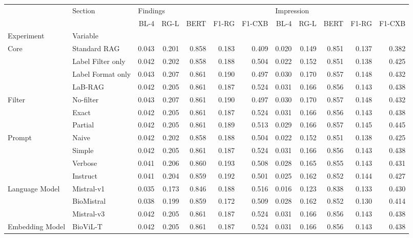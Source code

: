 \begin{tabular}{llrrrrrrrrrr}
\toprule
 & Section & \multicolumn{5}{l}{Findings} & \multicolumn{5}{l}{Impression} \\
 &  & BL-4 & RG-L & BERT & F1-RG & F1-CXB & BL-4 & RG-L & BERT & F1-RG & F1-CXB \\
Experiment & Variable &  &  &  &  &  &  &  &  &  &  \\
\midrule
\multirow[c]{4}{*}{Core} & Standard RAG & 0.043 & 0.201 & 0.858 & 0.183 & 0.409 & 0.020 & 0.149 & 0.851 & 0.137 & 0.382 \\
 & Label Filter only & 0.042 & 0.202 & 0.858 & 0.188 & 0.504 & 0.022 & 0.152 & 0.851 & 0.138 & 0.425 \\
 & Label Format only & 0.043 & 0.207 & 0.861 & 0.190 & 0.497 & 0.030 & 0.170 & 0.857 & 0.148 & 0.432 \\
 & LaB-RAG & 0.042 & 0.205 & 0.861 & 0.187 & 0.524 & 0.031 & 0.166 & 0.856 & 0.143 & 0.438 \\
\cmidrule{1-12}
\multirow[c]{3}{*}{Filter} & No-filter & 0.043 & 0.207 & 0.861 & 0.190 & 0.497 & 0.030 & 0.170 & 0.857 & 0.148 & 0.432 \\
 & Exact & 0.042 & 0.205 & 0.861 & 0.187 & 0.524 & 0.031 & 0.166 & 0.856 & 0.143 & 0.438 \\
 & Partial & 0.042 & 0.205 & 0.861 & 0.189 & 0.513 & 0.029 & 0.166 & 0.857 & 0.145 & 0.445 \\
\cmidrule{1-12}
\multirow[c]{4}{*}{Prompt} & Naive & 0.042 & 0.202 & 0.858 & 0.188 & 0.504 & 0.022 & 0.152 & 0.851 & 0.138 & 0.425 \\
 & Simple & 0.042 & 0.205 & 0.861 & 0.187 & 0.524 & 0.031 & 0.166 & 0.856 & 0.143 & 0.438 \\
 & Verbose & 0.041 & 0.206 & 0.860 & 0.193 & 0.508 & 0.028 & 0.165 & 0.855 & 0.143 & 0.431 \\
 & Instruct & 0.041 & 0.204 & 0.859 & 0.192 & 0.501 & 0.025 & 0.162 & 0.852 & 0.144 & 0.427 \\
\cmidrule{1-12}
\multirow[c]{3}{*}{Language Model} & Mistral-v1 & 0.035 & 0.173 & 0.846 & 0.188 & 0.516 & 0.016 & 0.123 & 0.838 & 0.133 & 0.430 \\
 & BioMistral & 0.038 & 0.199 & 0.859 & 0.172 & 0.509 & 0.028 & 0.162 & 0.852 & 0.130 & 0.414 \\
 & Mistral-v3 & 0.042 & 0.205 & 0.861 & 0.187 & 0.524 & 0.031 & 0.166 & 0.856 & 0.143 & 0.438 \\
\cmidrule{1-12}
\multirow[c]{2}{*}{Embedding Model} & BioViL-T & 0.042 & 0.205 & 0.861 & 0.187 & 0.524 & 0.031 & 0.166 & 0.856 & 0.143 & 0.438 \\

\end{tabular}
